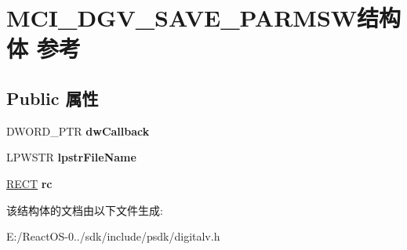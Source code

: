 \hypertarget{struct_m_c_i___d_g_v___s_a_v_e___p_a_r_m_s_w}{}\section{M\+C\+I\+\_\+\+D\+G\+V\+\_\+\+S\+A\+V\+E\+\_\+\+P\+A\+R\+M\+S\+W结构体 参考}
\label{struct_m_c_i___d_g_v___s_a_v_e___p_a_r_m_s_w}
\subsection*{Public 属性}
\begin{DoxyCompactItemize}
\item 
\mbox{\label{struct_m_c_i___d_g_v___s_a_v_e___p_a_r_m_s_w_ad186e4f317f9a7df457c2daca4b3a23d}} 
D\+W\+O\+R\+D\+\_\+\+P\+TR {\bfseries dw\+Callback}
\item 
\mbox{\label{struct_m_c_i___d_g_v___s_a_v_e___p_a_r_m_s_w_a73b40bdbde23f7f04112994009d75e0a}} 
L\+P\+W\+S\+TR {\bfseries lpstr\+File\+Name}
\item 
\mbox{\label{struct_m_c_i___d_g_v___s_a_v_e___p_a_r_m_s_w_a7e9f35b9eebe5140fbafb1365b26eef3}} 
\hyperlink{structtag_r_e_c_t}{R\+E\+CT} {\bfseries rc}
\end{DoxyCompactItemize}


该结构体的文档由以下文件生成\+:\begin{DoxyCompactItemize}
\item 
E\+:/\+React\+O\+S-\/0../sdk/include/psdk/digitalv.\+h\end{DoxyCompactItemize}
